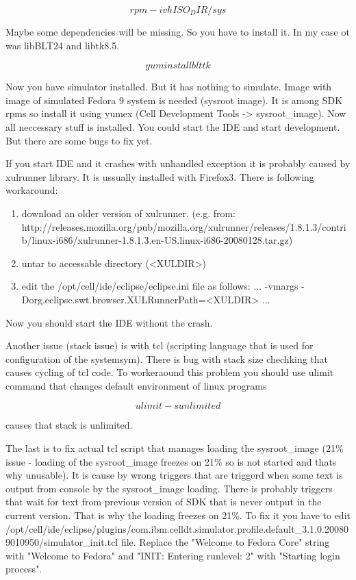 \documentclass{article}
\begin{document}
\begin{equation}
rpm -ivh ISO_DIR/sys
\end{equation}

Maybe some dependencies will be missing. So you have to install it. In my case ot was libBLT24 and libtk8.5.

\begin{equation}
yum install blt tk
\end{equation}

Now you have simulator installed. But it has nothing to simulate. Image with image of simulated Fedora 9 system is needed (sysroot image). It is among SDK rpms so install it using yumex (Cell Development Tools -> sysroot_image).
Now all neccessary stuff is installed. You could start the IDE and start development. But there are some bugs to fix yet. 

If you start IDE and it crashes with unhandled exception it is probably caused by xulrunner library. It is ussually installed with Firefox3. There is following workaround:
\begin{enumerate}
\item download an older version of xulrunner. (e.g. from: http://releases.mozilla.org/pub/mozilla.org/xulrunner/releases/1.8.1.3/contrib/linux-i686/xulrunner-1.8.1.3.en-US.linux-i686-20080128.tar.gz)
\item untar to accessable directory (<XULDIR>)
\item edit the /opt/cell/ide/eclipse/eclipse.ini file as follows:
...
-vmargs
-Dorg.eclipse.swt.browser.XULRunnerPath=<XULDIR>
...
\end{enumerate}
Now you should start the IDE without the crash.

Another issue (stack issue) is with tcl (scripting language that is used for configuration of the systemsym). There is bug with stack size chechking that causes cycling of tcl code. To workeraound this problem you should use ulimit command that changes default environment of linux programs

\begin{equation}
ulimit -s unlimited
\end{equation}

causes that stack is unlimited.

The last is to fix actual tcl script that manages loading the sysroot_image (21\% issue - loading of the sysroot_image freezes on 21\% so is not started and thats why unusable). It is cause by wrong triggers that are triggerd when some text is output from console by the sysroot_image loading. There is probably triggers that wait for text from previous version of SDK that is never output in the current version. That is why the loading freezes on 21\%. To fix it you have to edit /opt/cell/ide/eclipse/plugins/com.ibm.celldt.simulator.profile.default_3.1.0.200809010950/simulator_init.tcl file. Replace the "Welcome to Fedora Core" string with "Welcome to Fedora" and "INIT: Entering runlevel: 2" with "Starting login process".
\end{document}

